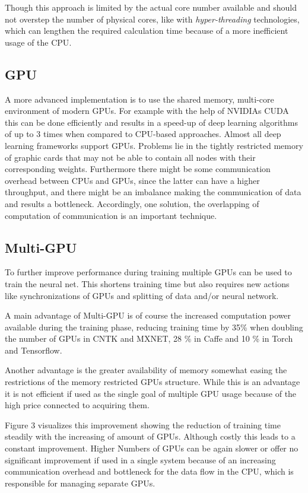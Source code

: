 \documentclass[conference]{IEEEtran}
\begin{document}
Though this approach is limited by the actual core number available and should not overstep the number of physical cores, like with \emph{hyper-threading} technologies, which can lengthen the required calculation time because of a more inefficient usage of the CPU\cite{shi2016benchmarking}.


\subsection{GPU}
A more advanced implementation is to use the shared memory, multi-core environment of modern GPUs. For example with the help of  NVIDIAs CUDA this can be done efficiently and results in a speed-up of deep learning algorithms of up to 3 times when compared to CPU-based approaches. Almost all deep learning frameworks support GPUs. 
Problems lie in the tightly restricted memory of graphic cards that may not be able to contain all nodes with their corresponding weights.  Furthermore there might be some communication overhead between CPUs and GPUs, since the latter can have a higher throughput, and there might be an imbalance making the communication of data and results a bottleneck. Accordingly, one solution, the overlapping of computation of communication is an important technique.


\subsection{Multi-GPU}
To further improve performance during training multiple GPUs can be used to train the neural net. This shortens training time but also requires new actions like synchronizations of GPUs and splitting of data and/or neural network.

A main advantage of Multi-GPU is of course the increased computation power available during the training phase, reducing training time by 35\% when doubling the number of GPUs in CNTK and MXNET, 28 \% in Caffe and 10 \% in  Torch and Tensorflow\cite{shi2016benchmarking}.

Another advantage is the greater availability of memory somewhat easing the restrictions of the memory restricted GPUs structure. While this is an advantage it is not efficient if used as the single goal of multiple GPU usage because of the high price connected to acquiring them.

Figure 3 visualizes this improvement showing the reduction of training time steadily with the increasing of amount of GPUs. Although costly this leads to a constant improvement. Higher Numbers of GPUs can be again slower or offer no significant improvement if used in a single system because of an increasing communication overhead and bottleneck for the data flow in the CPU, which is responsible for managing separate GPUs.
\end{document}
